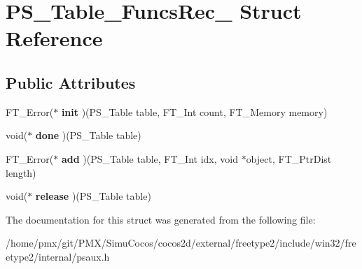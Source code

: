 \hypertarget{structPS__Table__FuncsRec__}{}\section{P\+S\+\_\+\+Table\+\_\+\+Funcs\+Rec\+\_\+ Struct Reference}
\label{structPS__Table__FuncsRec__}
\subsection*{Public Attributes}
\begin{DoxyCompactItemize}
\item 
\mbox{\label{structPS__Table__FuncsRec___ad0e795ae1e8a7040b7ef80d4a46e8d6a}} 
F\+T\+\_\+\+Error($\ast$ {\bfseries init} )(P\+S\+\_\+\+Table table, F\+T\+\_\+\+Int count, F\+T\+\_\+\+Memory memory)
\item 
\mbox{\label{structPS__Table__FuncsRec___a33d660e1444fbe0ef35a87645f5831ad}} 
void($\ast$ {\bfseries done} )(P\+S\+\_\+\+Table table)
\item 
\mbox{\label{structPS__Table__FuncsRec___a38a0e111e48a877f52cce490362e4c91}} 
F\+T\+\_\+\+Error($\ast$ {\bfseries add} )(P\+S\+\_\+\+Table table, F\+T\+\_\+\+Int idx, void $\ast$object, F\+T\+\_\+\+Ptr\+Dist length)
\item 
\mbox{\label{structPS__Table__FuncsRec___a252959418225279f78e2ece7fc7705bd}} 
void($\ast$ {\bfseries release} )(P\+S\+\_\+\+Table table)
\end{DoxyCompactItemize}


The documentation for this struct was generated from the following file\+:\begin{DoxyCompactItemize}
\item 
/home/pmx/git/\+P\+M\+X/\+Simu\+Cocos/cocos2d/external/freetype2/include/win32/freetype2/internal/psaux.\+h\end{DoxyCompactItemize}
